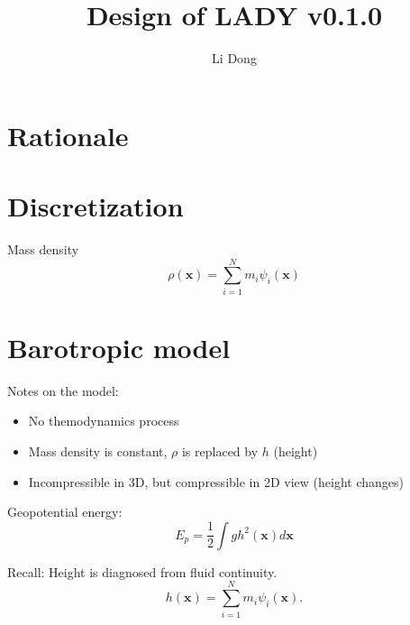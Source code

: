 \documentclass[slidestop,compress,mathserif]{beamer}
\title{Design of LADY v0.1.0}
\author{Li Dong}
\begin{document}
\begin{frame}
  \titlepage
\end{frame}

\section{Rationale}
\label{sec:Rationale}

\begin{frame}

\end{frame}

\section{Discretization}
\label{sec:Discretization}

\begin{frame}
  Mass density
  \begin{equation}
    \rho(\mathbf{x}) = \sum_{i = 1}^{N} m_i \psi_i(\mathbf{x})
  \end{equation}
\end{frame}

\section{Barotropic model}
\label{sec:Barotropic model}

\begin{frame}
  Notes on the model:
  \begin{itemize}
    \item No themodynamics process
    \item Mass density is constant, $\rho$ is replaced by $h$ (height)
    \item Incompressible in 3D, but compressible in 2D view (height changes)
  \end{itemize}
  Geopotential energy:
  \begin{equation}
    E_p = \frac{1}{2} \int g h^2(\mathbf{x}) d\mathbf{x}
    \label{eqn:geopotential-energy}
  \end{equation}
  \begin{exampleblock}{Recall: Height is diagnosed from fluid continuity.}
    \begin{equation*}
      h(\mathbf{x}) = \sum_{i = 1}^{N} m_i \psi_i(\mathbf{x}).
    \end{equation*}
  \end{exampleblock}
\end{frame}
\end{document}
